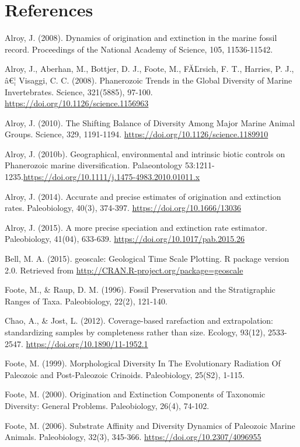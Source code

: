 \documentclass[]{article}
\newcommand{\euro}{€}
\begin{document}
\section{References}\label{references}

Alroy, J. (2008). Dynamics of origination and extinction in the marine
fossil record. Proceedings of the National Academy of Science, 105,
11536-11542.

Alroy, J., Aberhan, M., Bottjer, D. J., Foote, M., FĂĽrsich, F. T.,
Harries, P. J., â\euro{}¦ Visaggi, C. C. (2008). Phanerozoic Trends in
the Global Diversity of Marine Invertebrates. Science, 321(5885),
97-100. \url{https://doi.org/10.1126/science.1156963}

Alroy, J. (2010). The Shifting Balance of Diversity Among Major Marine
Animal Groups. Science, 329, 1191-1194.
\url{https://doi.org/10.1126/science.1189910}

Alroy, J. (2010b). Geographical, environmental and intrinsic biotic
controls on Phanerozoic marine diversification. Palaeontology
53:1211-1235.\url{https://doi.org/10.1111/j.1475-4983.2010.01011.x}

Alroy, J. (2014). Accurate and precise estimates of origination and
extinction rates. Paleobiology, 40(3), 374-397.
\url{https://doi.org/10.1666/13036}

Alroy, J. (2015). A more precise speciation and extinction rate
estimator. Paleobiology, 41(04), 633-639.
\url{https://doi.org/10.1017/pab.2015.26}

Bell, M. A. (2015). geoscale: Geological Time Scale Plotting. R package
version 2.0. Retrieved from
\url{http://CRAN.R-project.org/package=geoscale}

Foote, M., \& Raup, D. M. (1996). Fossil Preservation and the
Stratigraphic Ranges of Taxa. Paleobiology, 22(2), 121-140.

Chao, A., \& Jost, L. (2012). Coverage-based rarefaction and
extrapolation: standardizing samples by completeness rather than size.
Ecology, 93(12), 2533-2547. \url{https://doi.org/10.1890/11-1952.1}

Foote, M. (1999). Morphological Diversity In The Evolutionary Radiation
Of Paleozoic and Post-Paleozoic Crinoids. Paleobiology, 25(S2), 1-115.

Foote, M. (2000). Origination and Extinction Components of Taxonomic
Diversity: General Problems. Paleobiology, 26(4), 74-102.

Foote, M. (2006). Substrate Affinity and Diversity Dynamics of Paleozoic
Marine Animals. Paleobiology, 32(3), 345-366.
\url{https://doi.org/10.2307/4096955}
\end{document}
